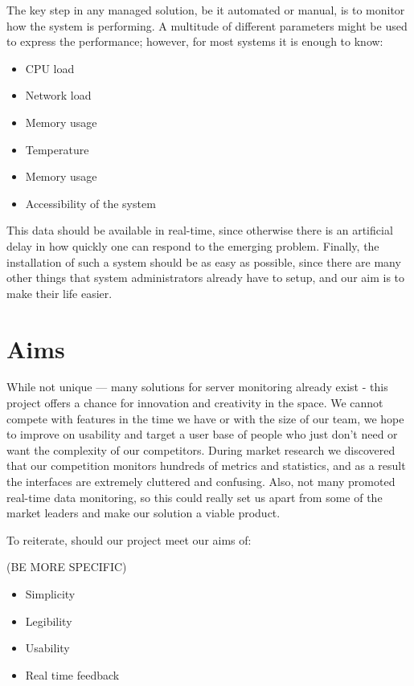 \documentclass{l3proj}
\begin{document}
The key step in any managed solution, be it automated or manual, is to monitor how the system is performing. A multitude of different parameters might be used to express the performance; however, for most systems it is enough to know:

\begin{itemize}
  \item CPU load
  \item Network load
  \item Memory usage
  \item Temperature
  \item Memory usage
  \item Accessibility of the system
\end{itemize}

This data should be available in real-time, since otherwise there is an artificial delay in how quickly one can respond to the emerging problem. Finally, the installation of such a system should be as easy as possible, since there are many other things that system administrators already have to setup, and our aim is to make their life easier.


\section{Aims}
\label{aims}

While not unique --- many solutions for server monitoring already exist - this project offers a chance for innovation and creativity in the space. We cannot compete with features in the time we have or with the size of our team, we hope to improve on usability and target a user base of people who just don’t need or want the complexity of our competitors. During market research we discovered that our competition monitors hundreds of metrics and statistics, and as a result the interfaces are extremely cluttered and confusing. Also, not many promoted real-time data monitoring, so this could really set us apart from some of the market leaders and make our solution a viable product.

To reiterate, should our project meet our aims of:

(BE MORE SPECIFIC)

\begin{itemize}
  \item Simplicity
  \item Legibility
  \item Usability
  \item Real time feedback
\end{itemize}
\end{document}
